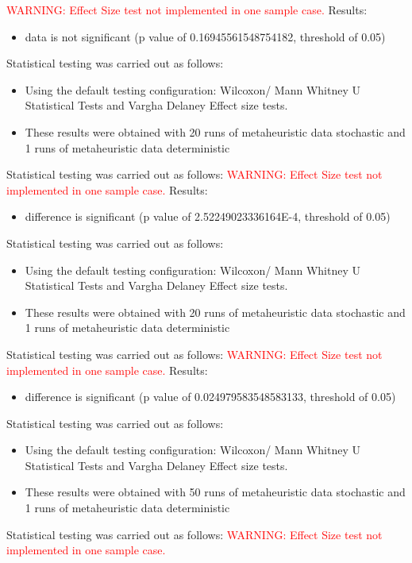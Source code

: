 \documentclass[]{article}
\begin{document}
\textcolor{Red}{WARNING: Effect Size test not implemented in one sample case.
}
Results:
\begin{itemize}
\item{data is not significant (p value of 0.16945561548754182, threshold of 0.05)}
\end{itemize}Statistical testing was carried out as follows: \begin{itemize}
\item{Using the default testing configuration: Wilcoxon/ Mann Whitney U Statistical Tests and Vargha Delaney Effect size tests.}
\item{These results were obtained with 20 runs of metaheuristic data stochastic and 1 runs of metaheuristic data deterministic}
\end{itemize}Statistical testing was carried out as follows: 
\textcolor{Red}{WARNING: Effect Size test not implemented in one sample case.
}
Results:
\begin{itemize}
\item{difference is significant (p value of 2.52249023336164E-4, threshold of 0.05)}
\end{itemize}Statistical testing was carried out as follows: \begin{itemize}
\item{Using the default testing configuration: Wilcoxon/ Mann Whitney U Statistical Tests and Vargha Delaney Effect size tests.}
\item{These results were obtained with 20 runs of metaheuristic data stochastic and 1 runs of metaheuristic data deterministic}
\end{itemize}Statistical testing was carried out as follows: 
\textcolor{Red}{WARNING: Effect Size test not implemented in one sample case.
}
Results:
\begin{itemize}
\item{difference is significant (p value of 0.024979583548583133, threshold of 0.05)}
\end{itemize}Statistical testing was carried out as follows: \begin{itemize}
\item{Using the default testing configuration: Wilcoxon/ Mann Whitney U Statistical Tests and Vargha Delaney Effect size tests.}
\item{These results were obtained with 50 runs of metaheuristic data stochastic and 1 runs of metaheuristic data deterministic}
\end{itemize}Statistical testing was carried out as follows: 
\textcolor{Red}{WARNING: Effect Size test not implemented in one sample case.
}
\end{document}
